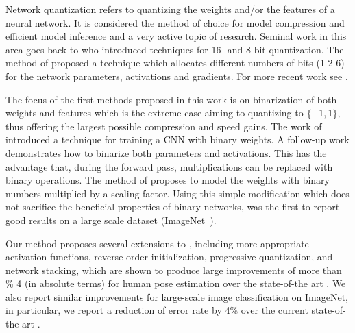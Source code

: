 \documentclass[10pt,twocolumn,letterpaper]{article}
\begin{document}
Network quantization refers to quantizing the weights and/or the features of a neural network. It is considered the method of choice for model compression and efficient model inference and a very active topic of research. Seminal work in this area goes back to \cite{courbariaux2014training, lin2015fixed} who introduced techniques for 16- and 8-bit quantization. The method of \cite{zhou2016dorefa} proposed a technique which allocates different numbers of bits (1-2-6) for the network parameters, activations and gradients. For more recent work see \cite{tung2018clip,wu2016quantized,zhou2018explicit,tang2018quantized}.

The focus of the first methods proposed in this work is on binarization of both weights and features which is the extreme case aiming to quantizing to $\{-1,1\}$, thus offering the largest possible compression and speed gains. The work of \cite{courbariaux2015binaryconnect} introduced a technique for training a CNN with binary weights. A follow-up work \cite{courbariaux2016binarized} demonstrates how to binarize both parameters and activations. This has the advantage that, during the forward pass, multiplications can be replaced with binary operations. The method of \cite{rastegari2016xnor} proposes to model the weights with binary numbers multiplied by a scaling factor. Using this simple modification which does not sacrifice the beneficial properties of binary networks, \cite{rastegari2016xnor} was the first to report good results on a large scale dataset (ImageNet~\cite{deng2009imagenet}). 

Our method proposes several extensions to \cite{rastegari2016xnor}, including more appropriate activation functions, reverse-order initialization, progressive quantization, and network stacking, which are shown to produce large improvements of more than \% 4 (in absolute terms) for human pose estimation over the state-of-the art \cite{bulat2017binarized}. We also report similar improvements for large-scale image classification on ImageNet, in particular, we report a reduction of error rate by 4\% over the current state-of-the-art \cite{rastegari2016xnor}.
\end{document}
